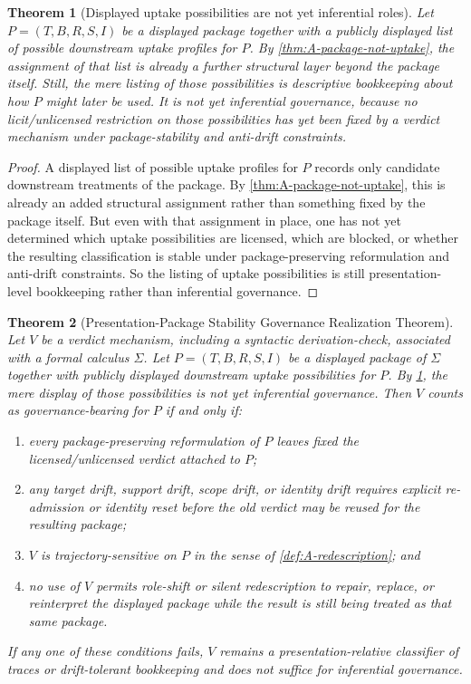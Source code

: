 \documentclass[11pt]{article}
\theoremstyle{plain}
\newtheorem{theorem}{Theorem}[section]
\theoremstyle{definition}
\begin{document}
\begin{theorem}[Displayed uptake possibilities are not yet inferential roles]
\label{thm:A-uptake-possibilities-not-roles}
Let $P=(T,B,R,S,I)$ be a displayed package together with a publicly displayed list of possible downstream uptake profiles for $P$. By \cref{thm:A-package-not-uptake}, the assignment of that list is already a further structural layer beyond the package itself. Still, the mere listing of those possibilities is descriptive bookkeeping about how $P$ might later be used. It is not yet inferential governance, because no licit/unlicensed restriction on those possibilities has yet been fixed by a verdict mechanism under package-stability and anti-drift constraints.
\end{theorem}

\begin{proof}
A displayed list of possible uptake profiles for $P$ records only candidate downstream treatments of the package. By \cref{thm:A-package-not-uptake}, this is already an added structural assignment rather than something fixed by the package itself. But even with that assignment in place, one has not yet determined which uptake possibilities are licensed, which are blocked, or whether the resulting classification is stable under package-preserving reformulation and anti-drift constraints. So the listing of uptake possibilities is still presentation-level bookkeeping rather than inferential governance.
\end{proof}

\begin{theorem}[Presentation-Package Stability Governance Realization Theorem]
\label{thm:A-realization-criterion}
Let $V$ be a verdict mechanism, including a syntactic derivation-check, associated with a formal calculus $\Sigma$. Let $P=(T,B,R,S,I)$ be a displayed package of $\Sigma$ together with publicly displayed downstream uptake possibilities for $P$. By \cref{thm:A-uptake-possibilities-not-roles}, the mere display of those possibilities is not yet inferential governance. Then $V$ counts as governance-bearing for $P$ if and only if:
\begin{enumerate}[label=(\roman*), leftmargin=2.5em]
    \item every package-preserving reformulation of $P$ leaves fixed the licensed/unlicensed verdict attached to $P$;
    \item any target drift, support drift, scope drift, or identity drift requires explicit re-admission or identity reset before the old verdict may be reused for the resulting package;
    \item $V$ is trajectory-sensitive on $P$ in the sense of \cref{def:A-redescription}; and
    \item no use of $V$ permits role-shift or silent redescription to repair, replace, or reinterpret the displayed package while the result is still being treated as that same package.
\end{enumerate}
If any one of these conditions fails, $V$ remains a presentation-relative classifier of traces or drift-tolerant bookkeeping and does not suffice for inferential governance.
\end{theorem}
\end{document}
